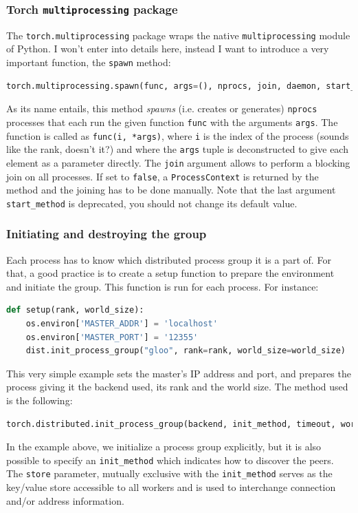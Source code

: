 \documentclass{article}
\begin{document}
\subsubsection{Torch \texorpdfstring{\lstinline{multiprocessing}}{multiprocessing} package}
The \lstinline{torch.multiprocessing} package wraps the native \lstinline{multiprocessing} module of Python. I won't enter into details here, instead I want to introduce a very important function, the \lstinline{spawn} method:
\begin{lstlisting}[language=Python]
  torch.multiprocessing.spawn(func, args=(), nprocs, join, daemon, start_method='spawn')
\end{lstlisting}
As its name entails, this method \textit{spawns} (i.e. creates or generates) \lstinline{nprocs} processes that each run the given function \lstinline{func} with the arguments \lstinline{args}. The function is called as \lstinline{func(i, *args)}, where \lstinline{i} is the index of the process (sounds like the rank, doesn't it?) and where the \lstinline{args} tuple is deconstructed to give each element as a parameter directly. The \lstinline{join} argument allows to perform a blocking join on all processes. If set to \lstinline{false}, a \lstinline{ProcessContext} is returned by the method and the joining has to be done manually. Note that the last argument \lstinline{start_method} is deprecated, you should not change its default value.

\subsubsection{Initiating and destroying the group}
Each process has to know which distributed process group it is a part of. For that, a good practice is to create a setup function to prepare the environment and initiate the group. This function is run for each process. For instance:
\begin{lstlisting}[language=Python]
  def setup(rank, world_size):
    os.environ['MASTER_ADDR'] = 'localhost'
    os.environ['MASTER_PORT'] = '12355'
    dist.init_process_group("gloo", rank=rank, world_size=world_size)
\end{lstlisting}
This very simple example sets the master's IP address and port, and prepares the process giving it the backend used, its rank and the world size.
The method used is the following:
\begin{lstlisting}[language=Python]
  torch.distributed.init_process_group(backend, init_method, timeout, world_size, rank, store, group_name, pg_options)
\end{lstlisting}
In the example above, we initialize a process group explicitly, but it is also possible to specify an \lstinline{init_method} which indicates how to discover the peers. The \lstinline{store} parameter, mutually exclusive with the \lstinline{init_method} serves as the key/value store accessible to all workers and is used to interchange connection and/or address information.
\end{document}

